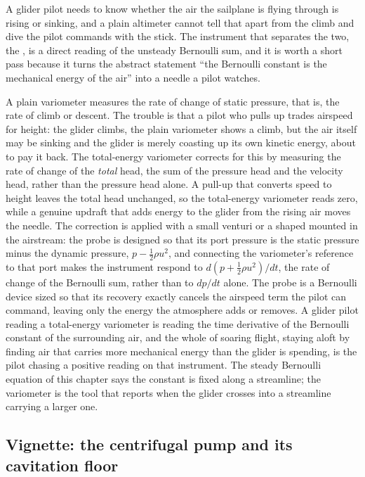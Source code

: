 A glider pilot needs to know whether the air the sailplane is flying
through is rising or sinking, and a plain altimeter cannot tell that
apart from the climb and dive the pilot commands with the stick. The
instrument that separates the two, the , is a direct reading of the unsteady Bernoulli sum, and it
is worth a short pass because it turns the abstract statement ``the
Bernoulli constant is the mechanical energy of the air'' into a needle
a pilot watches.

A plain variometer measures the rate of change of static pressure,
that is, the rate of climb or descent. The trouble is that a pilot who
pulls up trades airspeed for height: the glider climbs, the plain
variometer shows a climb, but the air itself may be sinking and the
glider is merely coasting up its own kinetic energy, about to pay it
back. The total-energy variometer corrects for this by measuring the
rate of change of the \emph{total} head, the sum of the pressure head
and the velocity head, rather than the pressure head alone. A pull-up
that converts speed to height leaves the total head unchanged, so the
total-energy variometer reads zero, while a genuine updraft that adds
energy to the glider from the rising air moves the needle. The
correction is applied with a small venturi or a shaped
 mounted in the airstream: the probe is
designed so that its port pressure is the static pressure minus the
dynamic pressure, $p - \tfrac12\rho u^2$, and connecting the
variometer's reference to that port makes the instrument respond to
$d(p + \tfrac12\rho u^2)/dt$, the rate of change of the Bernoulli sum,
rather than to $dp/dt$ alone. The probe is a Bernoulli device sized so
that its recovery exactly cancels the airspeed term the pilot can
command, leaving only the energy the atmosphere adds or removes. A
glider pilot reading a total-energy variometer is reading the time
derivative of the Bernoulli constant of the surrounding air, and the
whole of soaring flight, staying aloft by finding air that carries more
mechanical energy than the glider is spending, is the pilot chasing a
positive reading on that instrument. The steady Bernoulli equation of
this chapter says the constant is fixed along a streamline; the
variometer is the tool that reports when the glider crosses into a
streamline carrying a larger one.

\subsection{Vignette: the centrifugal pump and its cavitation floor}

